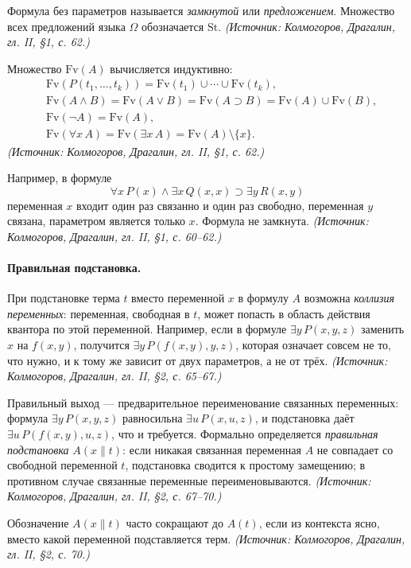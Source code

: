\documentclass[a4paper,12pt]{article}
\begin{document}
Формула без параметров называется \emph{замкнутой} или \emph{предложением}. Множество всех предложений языка \(\Omega\) обозначается \(\mathrm{St}\).
\textit{(Источник: Колмогоров, Драгалин, гл. II, §1, с. 62.)}

Множество \(\mathrm{Fv}(A)\) вычисляется индуктивно:
\[
\begin{aligned}
&\mathrm{Fv}(P(t_1,\ldots,t_k))=\mathrm{Fv}(t_1)\cup\cdots\cup\mathrm{Fv}(t_k),\\
&\mathrm{Fv}(A\wedge B)=\mathrm{Fv}(A\vee B)=\mathrm{Fv}(A\supset B)=\mathrm{Fv}(A)\cup\mathrm{Fv}(B),\\
&\mathrm{Fv}(\neg A)=\mathrm{Fv}(A),\\
&\mathrm{Fv}(\forall x\,A)=\mathrm{Fv}(\exists x\,A)=\mathrm{Fv}(A)\setminus\{x\}.
\end{aligned}
\]
\textit{(Источник: Колмогоров, Драгалин, гл. II, §1, с. 62.)}

Например, в формуле
\[
\forall x\,P(x)\wedge\exists x\,Q(x,x)\supset\exists y\,R(x,y)
\]
переменная \(x\) входит один раз связанно и один раз свободно, переменная \(y\) связана, параметром является только \(x\). Формула не замкнута.
\textit{(Источник: Колмогоров, Драгалин, гл. II, §1, с. 60--62.)}

\paragraph{Правильная подстановка.} При подстановке терма \(t\) вместо переменной \(x\) в формулу \(A\) возможна \emph{коллизия переменных}: переменная, свободная в \(t\), может попасть в область действия квантора по этой переменной. Например, если в формуле \(\exists y\,P(x,y,z)\) заменить \(x\) на \(f(x,y)\), получится \(\exists y\,P(f(x,y),y,z)\), которая означает совсем не то, что нужно, и к тому же зависит от двух параметров, а не от трёх.
\textit{(Источник: Колмогоров, Драгалин, гл. II, §2, с. 65--67.)}

Правильный выход — предварительное переименование связанных переменных: формула \(\exists y\,P(x,y,z)\) равносильна \(\exists u\,P(x,u,z)\), и подстановка даёт \(\exists u\,P(f(x,y),u,z)\), что и требуется. Формально определяется \emph{правильная подстановка} \(A(x\|t)\): если никакая связанная переменная \(A\) не совпадает со свободной переменной \(t\), подстановка сводится к простому замещению; в противном случае связанные переменные переименовываются.
\textit{(Источник: Колмогоров, Драгалин, гл. II, §2, с. 67--70.)}

Обозначение \(A(x\|t)\) часто сокращают до \(A(t)\), если из контекста ясно, вместо какой переменной подставляется терм.
\textit{(Источник: Колмогоров, Драгалин, гл. II, §2, с. 70.)}
\end{document}
